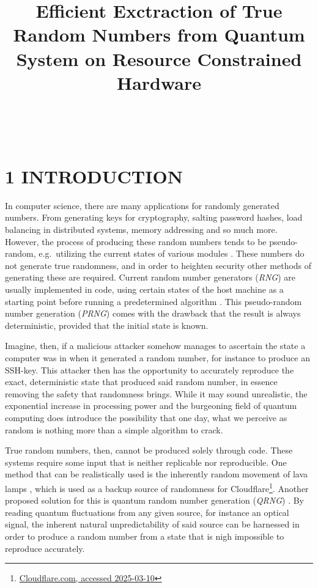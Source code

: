 \documentclass{sigchi}
\def\plaintitle{Efficient Exctraction of True Random Numbers from Quantum System on Resource Constrained Hardware}
\begin{document}
\title{\plaintitle}

\author{%
	\\
	\\
}

\maketitle


\section{1 INTRODUCTION}\label{introduction}

In computer science, there are many applications for randomly generated numbers. From generating keys for cryptography, salting password hashes, load balancing in distributed systems, memory addressing and so much more. However, the process of producing these random numbers tends to be pseudo-random, e.g.~utilizing the current states of various modules \cite{randomness}. These numbers do not generate true randomness, and in order to heighten security other methods of generating these are required. Current random number generators (\emph{RNG}) are usually implemented in code, using certain states of the host machine as a starting point before running a predetermined algorithm \cite{randomness}. This pseudo-random number generation (\emph{PRNG}) comes with the drawback that the result is always deterministic, provided that the initial state is known.

Imagine, then, if a malicious attacker somehow manages to ascertain the state a computer was in when it generated a random number, for instance to produce an SSH-key. This attacker then has the opportunity to accurately reproduce the exact, deterministic state that produced said random number, in essence removing the safety that randomness brings. While it may sound unrealistic, the exponential increase in processing power and the burgeoning field of quantum computing does introduce the possibility that one day, what we perceive as random is nothing more than a simple algorithm to crack.

True random numbers, then, cannot be produced solely through code. These systems require some input that is neither replicable nor reproducible. One method that can be realistically used is the inherently random movement of lava lamps \cite{lavarand}, which is used as a backup source of randomness for Cloudflare\footnote{\href{https://blog.cloudflare.com/randomness-101-lavarand-in-production/}{Cloudflare.com, accessed 2025-03-10}}. Another proposed solution for this is quantum random number generation (\emph{QRNG}) \cite{QRNG}. By reading quantum fluctuations from any given source, for instance an optical signal, the inherent natural unpredictability of said source can be harnessed in order to produce a random number from a state that is nigh impossible to reproduce accurately.
\end{document}
